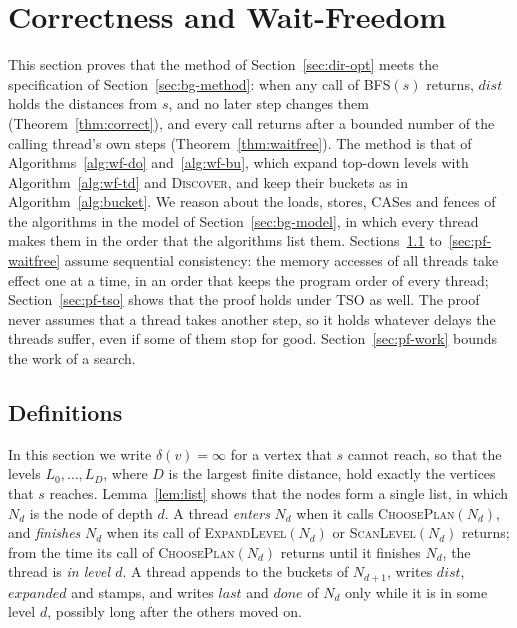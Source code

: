 \section{Correctness and Wait-Freedom}
\label{sec:proof}

This section proves that the method of Section~\ref{sec:dir-opt} meets the specification of Section~\ref{sec:bg-method}: when any call of \textsc{BFS}$(s)$ returns, $\mathit{dist}$ holds the distances from $s$, and no later step changes them (Theorem~\ref{thm:correct}), and every call returns after a bounded number of the calling thread's own steps (Theorem~\ref{thm:waitfree}). The method is that of Algorithms~\ref{alg:wf-do} and~\ref{alg:wf-bu}, which expand top-down levels with Algorithm~\ref{alg:wf-td} and \textsc{Discover}, and keep their buckets as in Algorithm~\ref{alg:bucket}. We reason about the loads, stores, CASes and fences of the algorithms in the model of Section~\ref{sec:bg-model}, in which every thread makes them in the order that the algorithms list them. Sections~\ref{sec:pf-defs} to~\ref{sec:pf-waitfree} assume sequential consistency: the memory accesses of all threads take effect one at a time, in an order that keeps the program order of every thread; Section~\ref{sec:pf-tso} shows that the proof holds under TSO as well. The proof never assumes that a thread takes another step, so it holds whatever delays the threads suffer, even if some of them stop for good. Section~\ref{sec:pf-work} bounds the work of a search.

\subsection{Definitions}
\label{sec:pf-defs}

In this section we write $\delta(v) = \infty$ for a vertex that $s$ cannot reach, so that the levels $L_0, \ldots, L_D$, where $D$ is the largest finite distance, hold exactly the vertices that $s$ reaches. Lemma~\ref{lem:list} shows that the nodes form a single list, in which $N_d$ is the node of depth $d$. A thread \emph{enters} $N_d$ when it calls \textsc{ChoosePlan}$(N_d)$, and \emph{finishes} $N_d$ when its call of \textsc{ExpandLevel}$(N_d)$ or \textsc{ScanLevel}$(N_d)$ returns; from the time its call of \textsc{ChoosePlan}$(N_d)$ returns until it finishes $N_d$, the thread is \emph{in level $d$}. A thread appends to the buckets of $N_{d+1}$, writes $\mathit{dist}$, $\mathit{expanded}$ and stamps, and writes $\mathit{last}$ and $\mathit{done}$ of $N_d$ only while it is in some level $d$, possibly long after the others moved on.

